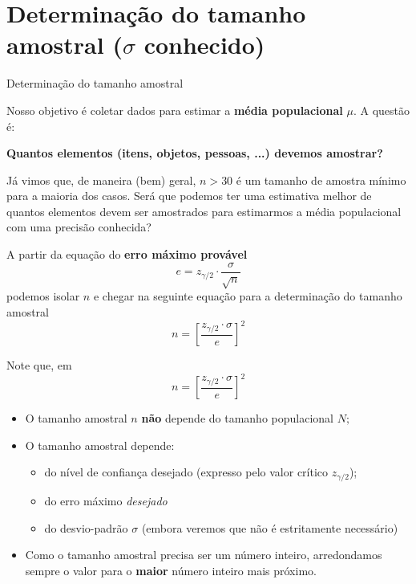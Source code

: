 \documentclass[14pt,aspectratio=1610]{beamer}
\begin{document}
	\section{Determinação do tamanho amostral ($\sigma$ conhecido)}
	\begin{frame}{Determinação do tamanho amostral}
		\begin{block}{}
			\justifying
			Nosso objetivo é coletar dados para estimar a \textbf{média populacional} $\mu$. A questão é:
			\begin{center}
				\textbf{Quantos elementos (itens, objetos, pessoas, ...) devemos amostrar?}   
			\end{center}
			
			Já vimos que, de maneira (bem) geral, $n>30$ é um tamanho de amostra mínimo para a maioria dos casos. Será que podemos ter uma estimativa melhor de quantos elementos devem ser amostrados para estimarmos a média populacional com uma precisão conhecida?   
		\end{block}
	\end{frame}
	
	\begin{frame}{}
		\begin{block}{}
			\justifying
			A partir da equação do \textbf{erro máximo provável}
			$$
			e = z_{\gamma/2} \cdot \frac{\sigma}{\sqrt{n}}
			$$ 
			podemos isolar $n$ e chegar na seguinte equação para a determinação do tamanho amostral
			$$
			n = \left[ \frac{z_{\gamma/2} \cdot \sigma}{e} \right]^2
			$$
		\end{block}
	\end{frame}
	
	\begin{frame}{}
		\begin{block}{}
			\justifying
			Note que, em
			$$
			n = \left[ \frac{z_{\gamma/2} \cdot \sigma}{e} \right]^2
			$$
			\begin{itemize}
				\item O tamanho amostral $n$ \textbf{não} depende do tamanho populacional $N;$
				\item O tamanho amostral depende:
				\begin{itemize}
					\item do nível de confiança desejado (expresso pelo valor crítico $z_{\gamma/2}$);
					\item do erro máximo \textsl{desejado}
					\item do desvio-padrão $\sigma$ (embora veremos que não é estritamente necessário)
				\end{itemize}
				\item Como o tamanho amostral precisa ser um número inteiro, arredondamos sempre o valor para o \textbf{maior} número inteiro mais próximo.
			\end{itemize}
		\end{block}
	\end{frame}
	
\end{document}
